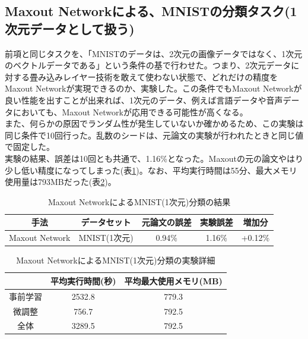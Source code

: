 \subsection{Maxout Networkによる、MNISTの分類タスク(1次元データとして扱う)}
前項と同じタスクを、「MNISTのデータは、2次元の画像データではなく、1次元のベクトルデータである」という条件の基で行わせた。つまり、2次元データに対する畳み込みレイヤー技術を敢えて使わない状態で、どれだけの精度をMaxout Networkが実現できるのか、実験した。この条件でもMaxout Networkが良い性能を出すことが出来れば、1次元のデータ、例えば言語データや音声データにおいても、Maxout Networkが応用できる可能性が高くなる。\\
また、何らかの原因でランダム性が発生していないか確かめるため、この実験は同じ条件で10回行った。乱数のシードは、元論文の実験が行われたときと同じ値で固定した。\\
実験の結果、誤差は10回とも共通で、1.16\%となった。Maxoutの元の論文やはり少し低い精度になってしまった(表\ref{c5_maxout_mnist1_result})。なお、平均実行時間は55分、最大メモリ使用量は793MBだった(表\ref{c5_maxout_mnist1_stat})。\\
\begin{table}[tdp]
\caption{Maxout NetworkによるMNIST(1次元)分類の結果}
\begin{center}
\begin{tabular}{|c|c|c|c|c|}\hline
手法 & データセット & 元論文の誤差 & 実験誤差 & 増加分\\ \hline
Maxout Network & MNIST(1次元) & 0.94\% & 1.16\% & +0.12\% \\ \hline
\end{tabular}
\end{center}
\label{c5_maxout_mnist1_result}
\end{table}%

\begin{table}[tdp]
\caption{Maxout NetworkによるMNIST(1次元)分類の実験詳細}
\begin{center}
\begin{tabular}{|c|c|c|}\hline
 & 平均実行時間(秒) & 平均最大使用メモリ(MB) \\ \hline
事前学習 & 2532.8 & 779.3 \\ \hline
微調整 & 756.7 & 792.5 \\ \hline
全体 & 3289.5 & 792.5 \\ \hline
\end{tabular}
\end{center}
\label{c5_maxout_mnist1_stat}
\end{table}%


